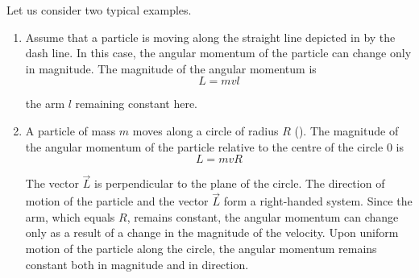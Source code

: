 Let us consider two typical examples.
\begin{enumerate}[1.]
	\item Assume that a particle is moving along the straight line depicted in  by the dash line. In this case, the angular momentum 	of the particle can change only in magnitude. The magnitude of the angular momentum is
	\begin{equation}\label{eq:3_110}
	L = mvl
	\end{equation}

	\noindent
	the arm $l$ remaining constant here.
	\item A particle of mass $m$ moves along a circle of radius $R$ (). The magnitude of the angular momentum of the particle relative to the centre of the circle $0$ is
	\begin{equation}\label{eq:3_111}
	L = mvR
	\end{equation}

	\noindent
	The vector $\vec{L}$ is perpendicular to the plane of the circle. The direction of motion of the particle and the vector $\vec{L}$ form a right-handed system. Since the arm, which equals $R$, remains constant, the angular momentum can change only as a result of a change in the magnitude of the velocity. Upon uniform motion of the particle along the circle, the angular momentum remains constant both in magnitude and in direction.
\end{enumerate}

